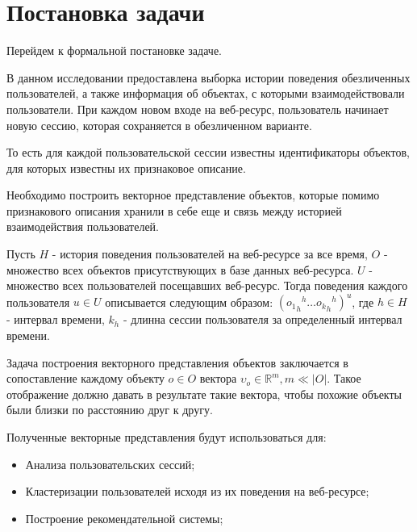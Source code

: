 \chapter{Постановка задачи} \label{ch1}
\newtheorem{definition}{Опредение}

Перейдем к формальной постановке задаче.

В данном исследовании предоставлена выборка истории поведения обезличенных пользователей, а также информация об объектах, с которыми взаимодействовали пользователи. При каждом новом входе на веб-ресурс, пользователь начинает новую сессию, которая сохраняется в обезличенном варианте.

То есть для каждой пользовательской сессии известны идентификаторы объектов, для которых известны их признаковое описание.

Необходимо построить векторное представление объектов, которые помимо признакового описания хранили в себе еще и связь между историей взаимодействия пользователей.

Пусть $H$ - история поведения пользователей на веб-ресурсе за все время, $O$ - множество всех объектов присутствующих в базе данных веб-ресурса. $U$ - множество всех пользователей посещавших веб-ресурс.
Тогда поведения каждого пользователя ${u \in U}$ описывается следующим образом: ${({{{o_1}_h}^{h} \dots {{o_k}_h}^{h}})^{u}}$, где ${h \in H}$ - интервал времени, ${k_h}$ - длинна сессии пользователя за определенный интервал времени.


Задача построения векторного представления объектов заключается в сопоставление каждому объекту $o \in O$ вектора $\upsilon_o \in \mathbb{R}^{m}, m \ll |O| $. Такое отображение должно давать в результате такие вектора, чтобы похожие объекты были близки по расстоянию друг к другу.


Полученные векторные представления будут использоваться для:

\begin{itemize}
	\item Анализа пользовательских сессий;
	\item Кластеризации пользователей исходя из их поведения на веб-ресурсе;
	\item Построение рекомендательной системы;
\end{itemize}

